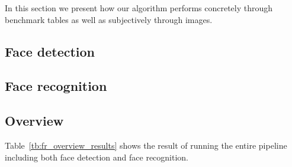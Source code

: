 In this section we present how our algorithm performs concretely through benchmark tables as well as subjectively through images.

\subsection{Face detection}


\subsection{Face recognition}


\subsection{Overview}
Table~\ref{tb:fr_overview_results} shows the result of running the entire pipeline including both face detection and face recognition.

\begin{center}
  \label{tb:fr_overview_results}
\end{center}
